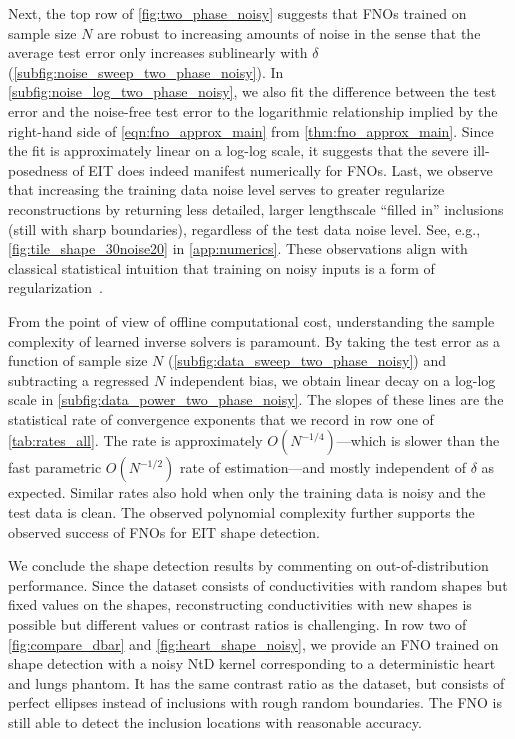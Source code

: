 \documentclass[pdflatex,sn-mathphys-num]{sn-jnl-preprint}
\theoremstyle{thmstyleone}%
\theoremstyle{thmstyletwo}%
\theoremstyle{thmstylethree}%
\numberwithin{equation}{section}
\numberwithin{theorem}{section}
\begin{document}
Next, the top row of \cref{fig:two_phase_noisy} suggests that FNOs trained on sample size $N$ are robust to increasing amounts of noise in the sense that the average test error only increases sublinearly with $\delta$ (\cref{subfig:noise_sweep_two_phase_noisy}). In \cref{subfig:noise_log_two_phase_noisy}, we also fit the difference between the test error and the noise-free test error to the logarithmic relationship implied by the right-hand side of \eqref{eqn:fno_approx_main} from \cref{thm:fno_approx_main}. Since the fit is approximately linear on a log-log scale, it suggests that the severe ill-posedness of EIT does indeed manifest numerically for FNOs. Last, we observe that increasing the training data noise level serves to greater regularize reconstructions by returning less detailed, larger lengthscale ``filled in'' inclusions (still with sharp boundaries), regardless of the test data noise level. See, e.g., \cref{fig:tile_shape_30noise20} in \cref{app:numerics}. These observations align with classical statistical intuition that training on noisy inputs is a form of regularization~\cite{bishop1995training}.

From the point of view of offline computational cost, understanding the sample complexity of learned inverse solvers is paramount. By taking the test error as a function of sample size $N$ (\cref{subfig:data_sweep_two_phase_noisy}) and subtracting a regressed $N$ independent bias, we obtain linear decay on a log-log scale in \cref{subfig:data_power_two_phase_noisy}. The slopes of these lines are the statistical rate of convergence exponents that we record in row one of \cref{tab:rates_all}. The rate is approximately $O(N^{-1/4})$---which is slower than the fast parametric $O(N^{-1/2})$ rate of estimation---and mostly independent of $\delta$ as expected. Similar rates also hold when only the training data is noisy and the test data is clean. The observed polynomial complexity further supports the observed success of FNOs for EIT shape detection.

We conclude the shape detection results by commenting on out-of-distribution performance. Since the dataset consists of conductivities with random shapes but fixed values on the shapes, reconstructing conductivities with new shapes is possible but different values or contrast ratios is challenging. In row two of \cref{fig:compare_dbar} and \cref{fig:heart_shape_noisy}, we provide an FNO trained on shape detection with a noisy NtD kernel corresponding to a deterministic heart and lungs phantom. It has the same contrast ratio as the dataset, but consists of perfect ellipses instead of inclusions with rough random boundaries. The FNO is still able to detect the inclusion locations with reasonable accuracy.
\end{document}
